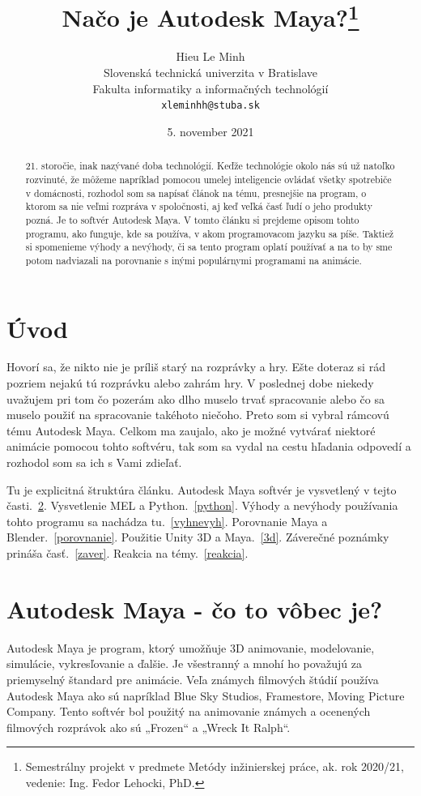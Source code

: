 \documentclass[10pt,oneside,slovak,a4paper]{article}
\title{Načo je Autodesk Maya?\thanks{Semestrálny projekt v predmete Metódy inžinierskej práce, ak. rok 2020/21, vedenie: Ing. Fedor Lehocki, PhD.}}
\author{Hieu Le Minh\\[2pt]
	{\small Slovenská technická univerzita v Bratislave}\\
	{\small Fakulta informatiky a informačných technológií}\\
	{\small \texttt{xleminhh@stuba.sk}}
	}
\date{\small 5. november 2021}
\begin{document}
\maketitle

\begin{abstract}
21. storočie, inak nazývané doba technológií. Keďže technológie okolo nás sú už natoľko rozvinuté, že môžeme napríklad pomocou umelej inteligencie ovládať všetky spotrebiče v domácnosti,
rozhodol som sa napísať článok na tému, presnejšie na program, o ktorom sa nie veľmi rozpráva v spoločnosti, aj keď veľká časť ľudí o jeho produkty pozná. Je to softvér Autodesk Maya.
V tomto článku si prejdeme opisom tohto programu, ako funguje, kde sa používa, v akom 
programovacom jazyku sa píše. Taktiež si spomenieme výhody a nevýhody, či 
sa tento program oplatí používať a na to by sme potom nadviazali na porovnanie s inými populárnymi programami na animácie.
\end{abstract}



\section{Úvod}

Hovorí sa, že nikto nie je príliš starý na rozprávky a hry. Ešte doteraz si rád pozriem nejakú tú rozprávku alebo zahrám hry. V poslednej dobe niekedy uvažujem pri tom čo pozerám ako dlho muselo trvať spracovanie alebo čo sa muselo použiť na spracovanie takéhoto niečoho. Preto som si vybral rámcovú tému Autodesk Maya. Celkom ma zaujalo, ako je možné vytvárať niektoré animácie pomocou tohto softvéru, tak som sa vydal na cestu hľadania odpovedí a rozhodol som sa ich s Vami zdieľať.


Tu je explicitná štruktúra článku.
Autodesk Maya softvér je vysvetlený v tejto časti.~\ref{AM}.
Vysvetlenie MEL a Python.~\ref{python}.
Výhody a nevýhody používania tohto programu sa nachádza tu.~\ref{vyhnevyh}.
Porovnanie Maya a Blender.~\ref{porovnanie}.
Použitie Unity 3D a Maya.~\ref{3d}.
Záverečné poznámky prináša časť.~\ref{zaver}.
Reakcia na témy.~\ref{reakcia}.



\section{Autodesk Maya - čo to vôbec je?} \label{AM}

Autodesk Maya je program, ktorý umožňuje 3D animovanie, modelovanie, simulácie, vykresľovanie a ďalšie. Je všestranný a mnohí ho považujú za priemyselný štandard pre animácie. Veľa známych filmových štúdií používa Autodesk Maya ako sú napríklad Blue Sky Studios, Framestore, Moving Picture Company. Tento softvér bol použitý na animovanie známych a ocenených filmových rozprávok ako sú „Frozen“ a „Wreck It Ralph“.\\
\end{document}
